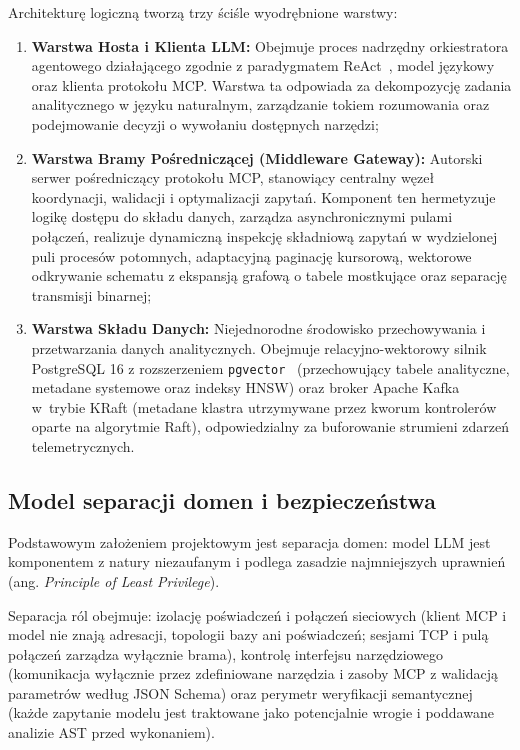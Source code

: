 Architekturę logiczną tworzą trzy ściśle wyodrębnione warstwy:
\begin{enumerate}
    \item \textbf{Warstwa Hosta i Klienta LLM:} Obejmuje proces nadrzędny orkiestratora agentowego działającego zgodnie z paradygmatem ReAct~\cite{yao2023react}, model językowy oraz klienta protokołu MCP. Warstwa ta odpowiada za dekompozycję zadania analitycznego w języku naturalnym, zarządzanie tokiem rozumowania oraz podejmowanie decyzji o wywołaniu dostępnych narzędzi;
    \item \textbf{Warstwa Bramy Pośredniczącej (Middleware Gateway):} Autorski serwer pośredniczący protokołu MCP, stanowiący centralny węzeł koordynacji, walidacji i optymalizacji zapytań. Komponent ten hermetyzuje logikę dostępu do składu danych, zarządza asynchronicznymi pulami połączeń, realizuje dynamiczną inspekcję składniową zapytań w wydzielonej puli procesów potomnych, adaptacyjną paginację kursorową, wektorowe odkrywanie schematu z ekspansją grafową o tabele mostkujące oraz separację transmisji binarnej;
    \item \textbf{Warstwa Składu Danych:} Niejednorodne środowisko przechowywania i przetwarzania danych analitycznych. Obejmuje relacyjno-wektorowy silnik PostgreSQL 16 z rozszerzeniem \texttt{pgvector}~\cite{pgvector} (przechowujący tabele analityczne, metadane systemowe oraz indeksy HNSW) oraz broker Apache Kafka~\cite{kreps2011kafka} w~trybie KRaft (metadane klastra utrzymywane przez kworum kontrolerów oparte na algorytmie Raft), odpowiedzialny za buforowanie strumieni zdarzeń telemetrycznych.
\end{enumerate}

\subsection{Model separacji domen i bezpieczeństwa}
\label{subsec:projekt_separacja_domen}

Podstawowym założeniem projektowym jest separacja domen: model LLM jest komponentem z natury niezaufanym i podlega zasadzie najmniejszych uprawnień (ang. \emph{Principle of Least Privilege}).

Separacja ról obejmuje: izolację poświadczeń i połączeń sieciowych (klient MCP i model nie znają adresacji, topologii bazy ani poświadczeń; sesjami TCP i pulą połączeń zarządza wyłącznie brama), kontrolę interfejsu narzędziowego (komunikacja wyłącznie przez zdefiniowane narzędzia i zasoby MCP z walidacją parametrów według JSON Schema) oraz perymetr weryfikacji semantycznej (każde zapytanie modelu jest traktowane jako potencjalnie wrogie i poddawane analizie AST przed wykonaniem).

